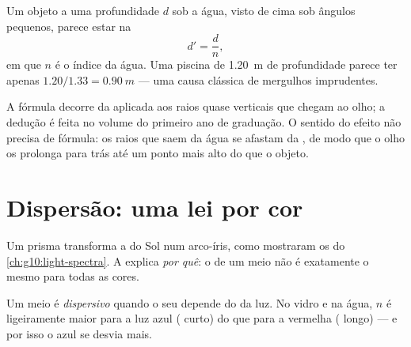 \begin{proposition}\label{prop:g10:refraction:depth}
Um objeto a uma profundidade $d$ sob a água, visto de cima sob ângulos
pequenos, parece estar na \emph{}
\[
d' = \frac{d}{n} ,
\]
em que $n$ é o índice da água. Uma piscina de \qty{1.20}{m} de
profundidade parece ter apenas $1.20/1.33 = \qty{0.90}{m}$ --- uma causa
clássica de mergulhos imprudentes.
\end{proposition}
\admitted

\begin{remark}\label{rem:g10:refraction:depthhonest}
A fórmula decorre da  aplicada aos raios quase verticais que
chegam ao olho; a dedução é feita no volume do primeiro ano de graduação.
O sentido do efeito não precisa de fórmula: os raios que saem da água se
afastam da , de modo que o olho os prolonga para trás até um ponto
mais alto do que o objeto.
\end{remark}

\section{Dispersão: uma lei por cor}

Um prisma transforma a  do Sol num arco-íris, como mostraram os
 do \cref{ch:g10:light-spectra}. A  explica \emph{por
quê}: o  de um meio não é exatamente o mesmo para todas
as cores.

\begin{definition}[Dispersão]\label{def:g10:refraction:dispersion}
Um meio é \emph{dispersivo} quando o seu  depende do  da luz. No vidro e na água, $n$ é
ligeiramente maior para a luz azul ( curto) do que
para a vermelha ( longo) --- e por isso o azul se
desvia mais.
\end{definition}

